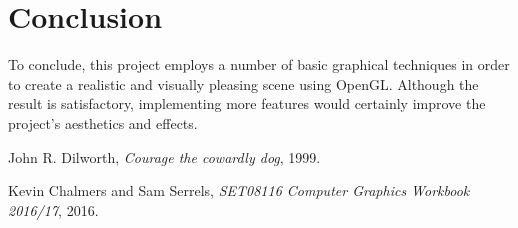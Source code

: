 \documentclass[10pt, a4paper]{article}
\begin{document}
    \section{Conclusion}
    To conclude, this project employs a number of basic graphical techniques in order to create a realistic and visually pleasing scene using OpenGL. Although the result is satisfactory, implementing more features would certainly improve the project's aesthetics and effects.


%

\begin{thebibliography}{9}

  John R. Dilworth,
  \emph{Courage the cowardly dog},
  1999.

    Kevin Chalmers and Sam Serrels,
    \emph{SET08116 Computer Graphics Workbook 2016/17},
    2016.

\end{thebibliography}
\end{document}

